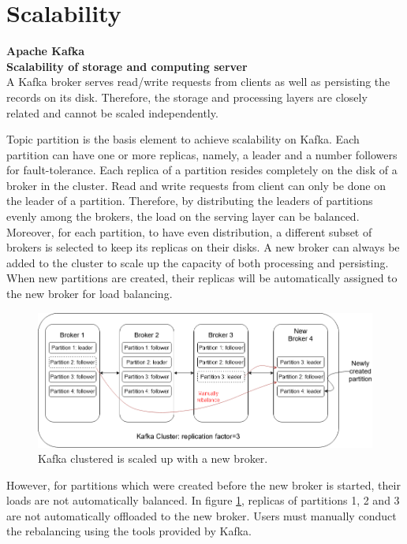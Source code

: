 \section{Scalability} \label{section:scalability}
\large \textbf{Apache Kafka}\\
\normalsize
\textbf{Scalability of storage and computing server}\\
A Kafka broker serves read/write requests from clients as well as persisting the records on its disk. Therefore, the storage and processing layers are closely related and cannot be scaled independently.  

Topic partition is the basis element to achieve scalability on Kafka. Each partition can have one or more replicas, namely, a leader and a number followers for fault-tolerance. Each replica of a partition resides completely on the disk of a broker in the cluster. Read and write requests from client can only be done on the leader of a partition. Therefore, by distributing the leaders of partitions evenly among the brokers, the load on the serving layer can be balanced. Moreover, for each partition, to have even distribution, a different subset of brokers is selected to keep its replicas on their disks. A new broker can always be added to the cluster to scale up the capacity of both processing and persisting. When new partitions are created, their replicas will be automatically assigned to the new broker for load balancing.
\begin{figure}[h]
	\centering
	\includegraphics[width=\linewidth]{images/scalability-kafka.png}
	\caption{Kafka clustered is scaled up with a new broker.}
	\label{fig:scalabilitykafka}
\end{figure}

However, for partitions which were created before the new broker is started, their loads are not automatically balanced. In figure \ref{fig:scalabilitykafka}, replicas of partitions 1, 2 and 3 are not automatically offloaded to the new broker. Users must manually conduct the rebalancing using the tools provided by Kafka.

